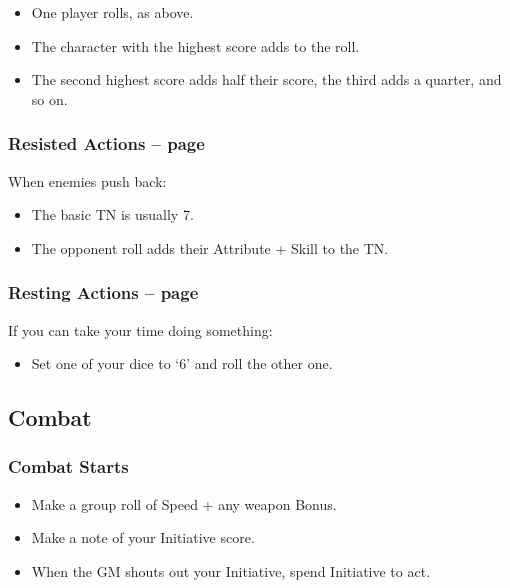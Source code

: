 \begin{multicols}{2}
\begin{itemize}
	\item{One player rolls, as above.}
	\item{The character with the highest score adds to the roll.}
	\item{The second highest score adds half their score, the third adds a quarter, and so on.}

\end{itemize}

\subsubsection{Resisted Actions -- page \pageref{resistedactions}}

When enemies push back:

\begin{itemize}

	\item{The basic TN is usually 7.}
	\item{The opponent roll adds their Attribute + Skill to the TN.}

\end{itemize}

\subsubsection{Resting Actions -- page \pageref{restingactions}}

If you can take your time doing something:

\begin{itemize}

	\item{Set one of your dice to `6' and roll the other one.}
	
\end{itemize}

\subsection{Combat}

\subsubsection{Combat Starts}

\begin{itemize}

	\item{Make a group roll of Speed + any weapon Bonus.}
	\item{Make a note of your Initiative score.}
	\item{When the GM shouts out your Initiative, spend Initiative to act.}


\end{itemize}
\end{multicols}

